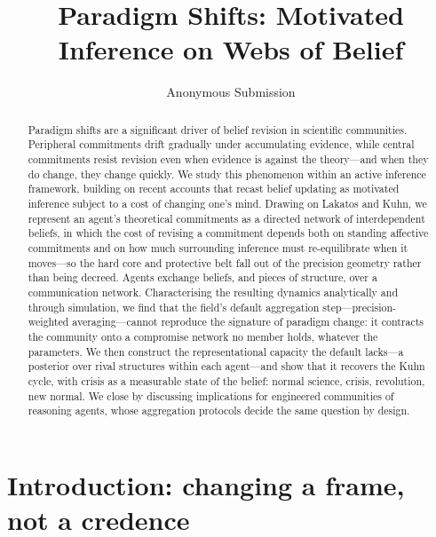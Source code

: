 \documentclass[runningheads]{llncs}
\title{Paradigm Shifts: Motivated Inference on Webs of Belief}
\author{Anonymous Submission}
\institute{Anonymous Institution(s)}
\begin{document}
\maketitle

\begin{abstract}
Paradigm shifts are a significant driver of belief revision in scientific communities.
Peripheral commitments drift gradually under accumulating evidence, while central commitments
resist revision even when evidence is against the theory---and when they do change, they
change quickly. We study this phenomenon within an active inference framework, building on
recent accounts that recast belief updating as motivated inference subject to a cost of
changing one's mind. Drawing on Lakatos and Kuhn, we represent an agent's theoretical
commitments as a directed network of interdependent beliefs, in which the cost of revising a
commitment depends both on standing affective commitments and on how much surrounding
inference must re-equilibrate when it moves---so the hard core and protective belt fall out
of the precision geometry rather than being decreed. Agents exchange beliefs, and pieces of
structure, over a communication network. Characterising the resulting dynamics analytically
and through simulation, we find that the field's default aggregation step---precision-weighted
averaging---cannot reproduce the signature of paradigm change: it contracts the community onto
a compromise network no member holds, whatever the parameters. We then construct the
representational capacity the default lacks---a posterior over rival structures within each
agent---and show that it recovers the Kuhn cycle, with crisis as a measurable state of the
belief: normal science, crisis, revolution, new normal. We close by discussing implications
for engineered communities of reasoning agents, whose aggregation protocols decide the same
question by design.

\end{abstract}

\section{Introduction: changing a frame, not a credence}
\label{sec:background}
\end{document}
